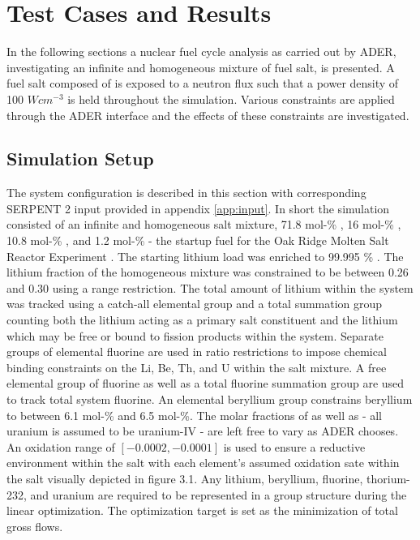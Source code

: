 \chapter{Test Cases and Results}
\label{ch:results}

In the following sections a nuclear fuel cycle analysis as carried out by ADER,
investigating an infinite and homogeneous mixture of fuel salt, is presented.
A fuel salt composed of  is exposed to a neutron
flux such that a power density of 100 $W cm^{-3}$ is held throughout the
simulation. Various constraints are applied through the ADER interface and
the effects of these constraints are investigated. 

\section{Simulation Setup}\label{ssec:setup}
The system configuration is described in this section with corresponding 
SERPENT 2
input provided in appendix \ref{app:input}. In short the simulation consisted
of an infinite and homogeneous salt mixture, 71.8 mol-\% , 16 mol-\%
, 10.8 mol-\% , and 1.2 mol-\%  - the startup
fuel for the Oak Ridge Molten Salt Reactor Experiment \cite{ORNL}. The starting
lithium load was enriched to 99.995 \% . The lithium
fraction of the homogeneous mixture was constrained to be between 0.26 and 0.30
using a range restriction. The total amount of lithium within the system was
tracked using a catch-all elemental group and a total summation group counting
both the lithium acting as a primary salt constituent and the lithium which may
be free or bound to fission products within the system. Separate groups of
elemental fluorine are used in ratio restrictions to impose chemical binding 
constraints on the Li, Be, Th, and U within the salt mixture. A free elemental
group of fluorine as well as a total fluorine summation group are used to track
total system fluorine. An elemental beryllium group constrains beryllium to
between 6.1 mol-\% and 6.5 mol-\%. The molar fractions of  as well
as  - all uranium is assumed to be uranium-IV - are left free to vary
as ADER chooses. An oxidation range of $[-0.0002, -0.0001]$ is used to ensure
a reductive environment within the salt with each element's assumed oxidation
sate within the salt visually depicted in figure 3.1. 
Any lithium, beryllium, fluorine, thorium-232, and uranium are required to be
represented in a group structure during the linear optimization. The
optimization target is set as the minimization of total gross flows.

